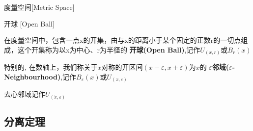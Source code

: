 \documentclass[UTF8]{ctexart}
\begin{document}
            \begin{dfn}
                {度量空间}[Metric Space]
                
            \end{dfn}

            \begin{dfn}
				{开球}
                [Open Ball]
				
				在度量空间中，包含一点x的开集，由与x的距离小于某个固定的正数r的一切点组成，这个开集称为以x为中心、r为半径的 \textbf{开球(Open Ball)},记作\(U_(x,r)\)或\(B_{r}(x)\)

				特别的, 在数轴上，我们称关于\(x\)对称的开区间\((x-\varepsilon,x+\varepsilon)\)为\(x\)的 \textbf{\(\varepsilon\)邻域(\(\varepsilon\)-Neighbourhood)},记作\(B_{\varepsilon}(x)\)或\(U_(x,\varepsilon)\)

				去心邻域记作\(U_(\dot{x},\varepsilon)\)
		\end{dfn}

        \subsection{分离定理}
            
\end{document}

